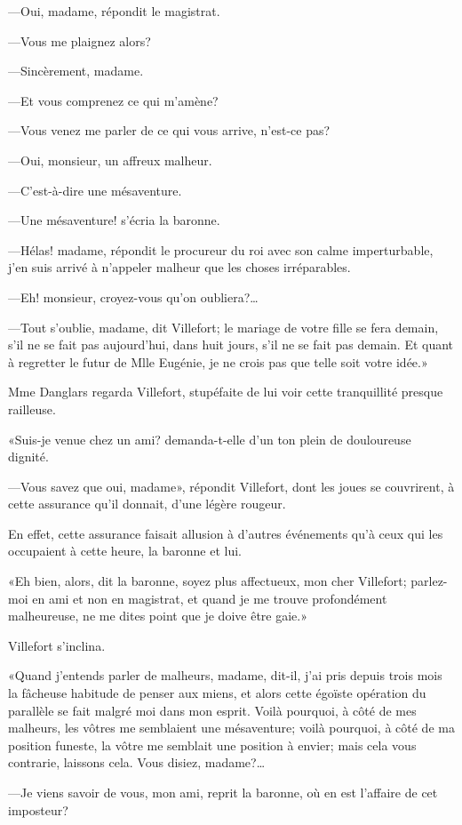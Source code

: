 —Oui, madame, répondit le magistrat. 

—Vous me plaignez alors? 

—Sincèrement, madame. 

—Et vous comprenez ce qui m'amène? 

—Vous venez me parler de ce qui vous arrive, n'est-ce pas? 

—Oui, monsieur, un affreux malheur. 

—C'est-à-dire une mésaventure. 

—Une mésaventure! s'écria la baronne. 

—Hélas! madame, répondit le procureur du roi avec son calme imperturbable, j'en suis arrivé à n'appeler malheur que les choses irréparables. 

—Eh! monsieur, croyez-vous qu'on oubliera?\dots 

—Tout s'oublie, madame, dit Villefort; le mariage de votre fille se fera demain, s'il ne se fait pas aujourd'hui, dans huit jours, s'il ne se fait pas demain. Et quant à regretter le futur de Mlle Eugénie, je ne crois pas que telle soit votre idée.» 

Mme Danglars regarda Villefort, stupéfaite de lui voir cette tranquillité presque railleuse. 

«Suis-je venue chez un ami? demanda-t-elle d'un ton plein de douloureuse dignité. 

—Vous savez que oui, madame», répondit Villefort, dont les joues se couvrirent, à cette assurance qu'il donnait, d'une légère rougeur. 

En effet, cette assurance faisait allusion à d'autres événements qu'à ceux qui les occupaient à cette heure, la baronne et lui. 

«Eh bien, alors, dit la baronne, soyez plus affectueux, mon cher Villefort; parlez-moi en ami et non en magistrat, et quand je me trouve profondément malheureuse, ne me dites point que je doive être gaie.» 

Villefort s'inclina. 

«Quand j'entends parler de malheurs, madame, dit-il, j'ai pris depuis trois mois la fâcheuse habitude de penser aux miens, et alors cette égoïste opération du parallèle se fait malgré moi dans mon esprit. Voilà pourquoi, à côté de mes malheurs, les vôtres me semblaient une mésaventure; voilà pourquoi, à côté de ma position funeste, la vôtre me semblait une position à envier; mais cela vous contrarie, laissons cela. Vous disiez, madame?\dots 

—Je viens savoir de vous, mon ami, reprit la baronne, où en est l'affaire de cet imposteur? 

